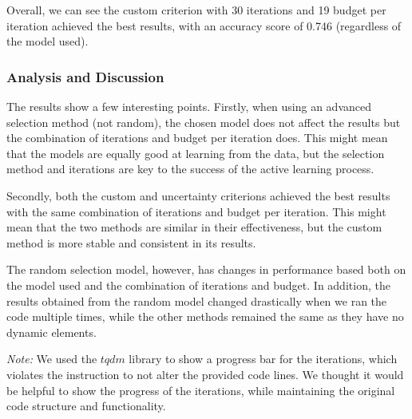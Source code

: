 \documentclass[12pt]{article}
\begin{document}
Overall, we can see the custom criterion with 30 iterations and 19 budget per iteration achieved the best results, with an accuracy score of 0.746 (regardless of the model used).

\subsubsection*{Analysis and Discussion}

The results show a few interesting points. Firstly, when using an advanced selection method (not random), the chosen model does not affect the results but the combination of iterations and budget per iteration does. This might mean that the models are equally good at learning from the data, but the selection method and iterations are key to the success of the active learning process.

Secondly, both the custom and uncertainty criterions achieved the best results with the same combination of iterations and budget per iteration. This might mean that the two methods are similar in their effectiveness, but the custom method is more stable and consistent in its results.

 The random selection model, however, has changes in performance based both on the model used and the combination of iterations and budget. In addition, the results obtained from the random model changed drastically when we ran the code multiple times, while the other methods remained the same as they have no dynamic elements. 


\vspace{1em}
\textsl{Note:} We used the $tqdm$ library to show a progress bar for the iterations, which violates the instruction to not alter the provided code lines. We thought it would be helpful to show the progress of the iterations, while maintaining the original code structure and functionality.
\end{document}
